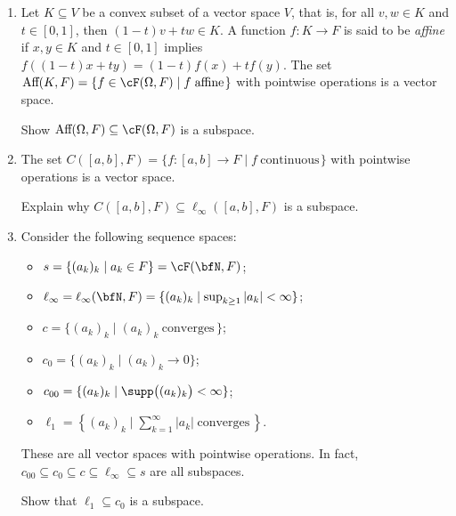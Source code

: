 \begin{example}
\begin{enumerate}[label = (\arabic*),itemsep=1pt,topsep=3pt]
            \item Let $K \subseteq V$ be a convex subset of a vector space $V$, that is, for all $v,w \in K$ and $t \in [0,1]$, then $(1-t)v + tw \in K$. A function $f:K \rightarrow F$ is said to be \textit{affine} if $x,y \in K$ and $t \in [0,1]$ implies $f((1-t)x + ty) = (1-t)f(x) + tf(y)$. The set \newline $\text{Aff}(K,F) = \{f \in \cF(\Omega,F) \mid f \hspace{3pt}\text{affine}\hspace{1pt}\}$ with pointwise operations is a vector space.
                \begin{exercise}
                    Show $\text{Aff}(\Omega,F) \subseteq \cF(\Omega,F)$ is a subspace.
                \end{exercise}
            \item The set $C([a,b],F) = \{f:[a,b] \rightarrow F \mid f \hspace{3pt}\text{continuous}\hspace{1pt}\}$ with pointwise operations is a vector space.
                \begin{exercise}
                    Explain why $C([a,b],F) \subseteq \ell_\infty([a,b],F)$ is a subspace.
                \end{exercise}
            \item Consider the following sequence spaces:
                \begin{itemize}
                    \item $s = \{(a_k)_k \mid a_k \in F\} = \cF(\bfN,F)$;
                    \item $\ell_\infty = \ell_\infty(\bfN,F) = \{(a_k)_k \mid \sup_{k \geq 1}|a_k| < \infty\}$;
                    \item $c = \{(a_k)_k \mid (a_k)_k \hspace{3pt}\text{converges}\hspace{2pt}\}$;
                    \item $c_0 = \{(a_k)_k \mid (a_k)_k \rightarrow 0\}$;
                    \item $c_{00} = \{(a_k)_k \mid \supp\bigl((a_k)_k\bigr) < \infty\}$;
                    \item $\ell_1 = \left\{ (a_k)_k \mid \sum_{k = 1}^\infty |a_k| \hspace{3pt}\text{converges}\hspace{2pt} \right\}$.
                \end{itemize}
            These are all vector spaces with pointwise operations. In fact, $c_{00} \subseteq c_0 \subseteq c \subseteq \ell_\infty \subseteq s$ are all subspaces.
                \begin{exercise}
                    Show that $\ell_1 \subseteq c_0$ is a subspace.
                \end{exercise}


\end{enumerate}
\end{example}
